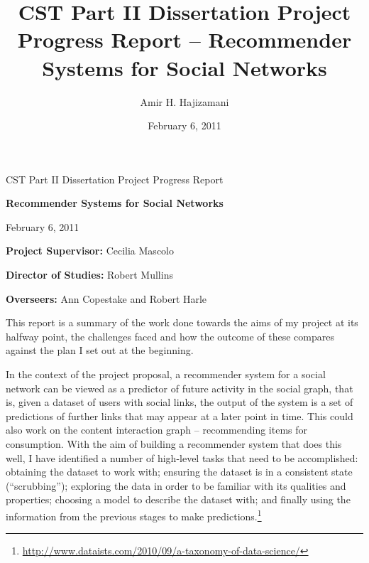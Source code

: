 \documentclass[a4paper,11pt,titlepage]{article}
\title{CST Part II Dissertation Project Progress Report -- Recommender Systems for Social Networks}
\author{Amir H. Hajizamani}
\date{February 6, 2011}
\begin{document}
\begin{titlepage}
\medskip
{}
\medskip
{}

\vfill

\centerline{\large CST Part II Dissertation Project Progress Report}
\vspace{0.4in}
\centerline{\Large\bf Recommender Systems for Social Networks}
\vspace{0.3in}
\centerline{\large{February 6, 2011}}

\vfill

{\bf Project Supervisor:} Cecilia Mascolo

\vspace{0.2in}

{\bf Director of Studies:} Robert Mullins

\vspace{0.2in}

{\bf Overseers:} Ann Copestake and Robert Harle

\vspace{0.2in}

\end{titlepage}

This report is a summary of the work done towards the aims of my project at its halfway point, the challenges faced and how the outcome of these compares against the plan I set out at the beginning.

In the context of the project proposal, a recommender system for a social network can be viewed as a predictor of future activity in the social graph, that is, given a dataset of users with social links, the output of the system is a set of predictions of further links that may appear at a later point in time. This could also work on the content interaction graph -- recommending items for consumption. With the aim of building a recommender system that does this well, I have identified a number of high-level tasks that need to be accomplished: obtaining the dataset to work with; ensuring the dataset is in a consistent state (``scrubbing''); exploring the data in order to be familiar with its qualities and properties; choosing a model to describe the dataset with; and finally using the information from the previous stages to make predictions.\footnote{\url{http://www.dataists.com/2010/09/a-taxonomy-of-data-science/}}
\end{document}
